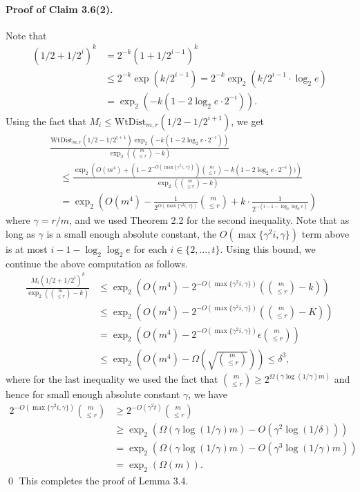 \documentclass[10pt,a4paper]{article}
\begin{document}
\paragraph{Proof of Claim 3.6(2).} Note that
\begin{align*}(1/2+1/2^i)^k&=2^{-k}(1+1/2^{i-1})^k\\&\le2^{-k}\exp(k/2^{i-1})=2^{-k}\operatorname{exp}_2(k/2^{i-1}\cdot\log_2e)\\&=\operatorname{exp}_2(-k(1-2\log_2e\cdot2^{-i})).\end{align*}
Using the fact that $M_i\le\mathrm{WtDist}_{m,r}(1/2-1/2^{i+1})$, we get
\begin{align*}&\frac{\mathrm{WtDist}_{m,r}(1/2-1/2^{i+1})\operatorname{exp}_2(-k(1-2\log_2e\cdot2^{-i}))}{\operatorname{exp}_2\left(\binom m{\le r}-k\right)}\\&\quad\le\frac{\operatorname{exp}_2\left(O(m^4)+(1-2^{-O(\max\{\gamma^2i,\gamma\})})\binom m{\le r}-k(1-2\log_2e\cdot2^{-i}))\right)}{\operatorname{exp}_2\left(\binom m{\le r}-k\right)}\\&\quad=\operatorname{exp}_2\left(O(m^4)-\frac1{2^{O(\max\{\gamma^2i,\gamma\})}}\binom m{\le r}+k\cdot\frac1{2^{-(i-1-\log_2\log_2e)}}\right)\end{align*}
where $\gamma=r/m$, and we used Theorem 2.2 for the second inequality.
Note that as long as $\gamma$ is a small enough absolute constant, the $O(\max\{\gamma^2i,\gamma\})$ term above is at most $i-1-\log_2\log_2e$ for each $i\in\{2,\ldots,t\}$. Using this bound, we continue the above computation as follows.
\begin{align*}\frac{M_i(1/2+1/2^i)^k}{\operatorname{exp}_2\left(\binom m{\le r}-k\right)}&\le\operatorname{exp}_2\left(O(m^4)-2^{-O(\max\{\gamma^2i,\gamma\})}\left(\binom m{\le r}-k\right)\right)\\&\le\operatorname{exp}_2\left(O(m^4)-2^{-O(\max\{\gamma^2i,\gamma\})}\left(\binom m{\le r}-K\right)\right)\\&=\operatorname{exp}_2\left(O(m^4)-2^{-O(\max\{\gamma^2i,\gamma\})}\epsilon\binom m{\le r}\right)\\&\le\operatorname{exp}_2\left(O(m^4)-\Omega\left(\sqrt{\binom m{\le r}}\right)\right)\le\delta^3,\end{align*}
where for the last inequality we used the fact that $\binom m{\le r}\ge2^{\Omega(\gamma\log(1/\gamma)m)}$ and hence for small enough absolute constant $\gamma$, we have
\begin{align*}2^{-O(\max\{\gamma^2i,\gamma\})}\binom m{\le r}&\ge2^{-O(\gamma^2t)}\binom m{\le r}\\&\ge\operatorname{exp}_2(\Omega(\gamma\log(1/\gamma)m)-O(\gamma^2\log(1/\delta)))\\&=\operatorname{exp}_2(\Omega(\gamma\log(1/\gamma)m)-O(\gamma^3\log(1/\gamma)m))\\&=\operatorname{exp}_2(\Omega(m)).\end{align*}\qed
This completes the proof of Lemma 3.4.
\end{document}
